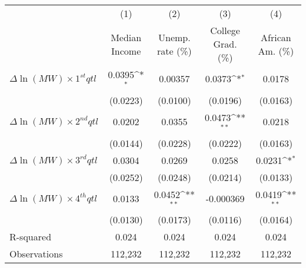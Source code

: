 {
\def\sym#1{\ifmmode^{#1}\else\(^{#1}\)\fi}
\begin{tabular}{l*{4}{c}}
\hline\hline
          &\multicolumn{1}{c}{(1)}&\multicolumn{1}{c}{(2)}&\multicolumn{1}{c}{(3)}&\multicolumn{1}{c}{(4)}\\
          &\multicolumn{1}{c}{Median Income}&\multicolumn{1}{c}{Unemp. rate (\%)}&\multicolumn{1}{c}{College Grad. (\%)}&\multicolumn{1}{c}{African Am. (\%)}\\
\hline
$\Delta \ln(MW) \times 1^{st} qtl$&   0.0395\sym{*}  &  0.00357         &   0.0373\sym{*}  &   0.0178         \\
          & (0.0223)         & (0.0100)         & (0.0196)         & (0.0163)         \\
[1em]
$\Delta \ln(MW) \times 2^{nd} qtl$&   0.0202         &   0.0355         &   0.0473\sym{**} &   0.0218         \\
          & (0.0144)         & (0.0228)         & (0.0222)         & (0.0163)         \\
[1em]
$\Delta \ln(MW) \times 3^{rd} qtl$&   0.0304         &   0.0269         &   0.0258         &   0.0231\sym{*}  \\
          & (0.0252)         & (0.0248)         & (0.0214)         & (0.0133)         \\
[1em]
$\Delta \ln(MW) \times 4^{th} qtl$&   0.0133         &   0.0452\sym{**} &-0.000369         &   0.0419\sym{**} \\
          & (0.0130)         & (0.0173)         & (0.0116)         & (0.0164)         \\
\hline
R-squared &    0.024         &    0.024         &    0.024         &    0.024         \\
Observations&  112,232         &  112,232         &  112,232         &  112,232         \\
\hline\hline
\end{tabular}
}
